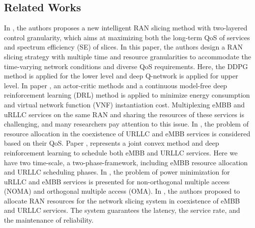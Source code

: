 \documentclass{article}
\begin{document}
\subsection{Related Works} 
In \cite{mei2021intelligent}, the authors proposes a new intelligent RAN slicing method with two-layered control granularity, which aims at maximizing both the long-term QoS of services and spectrum efficiency (SE) of slices. In this paper, the authors design a RAN slicing strategy with multiple time and
resource granularities to accommodate the time-varying network conditions and diverse QoS requirements.
Here, the DDPG method is applied for the lower level and deep Q-network is applied for upper level.
In paper \cite{rezazadeh2021actor}, an actor-critic methods and a continuous model-free deep reinforcement
learning (DRL) method is applied to minimize energy consumption and virtual network function (VNF) instantiation cost.
Multiplexing eMBB and uRLLC services on the same RAN and sharing the resources of these services is challenging, and many researchers pay attention to this issue.
In \cite{setayesh2020joint,yang2020should}, the problem of resource allocation in the coexistence of URLLC and eMBB services is considered based on their QoS. 
Paper \cite{alsenwi2021intelligent}, represents a joint convex method and deep reinforcement learning to schedule both eMBB and URLLC services. Here we have two time-scale, a two-phase-framework, including eMBB resource allocation and URLLC scheduling phases.  
In \cite{saggese2021power}, the problem of power minimization for uRLLC and eMBB services is presented for non-orthogonal multiple access (NOMA) and orthogonal multiple access (OMA).
 In \cite{korrai2020ran}, the authors proposed to allocate RAN resources for the network slicing system in coexistence of eMBB and URLLC services. The system guarantees the latency, the service rate, and the maintenance of reliability.
\end{document}
